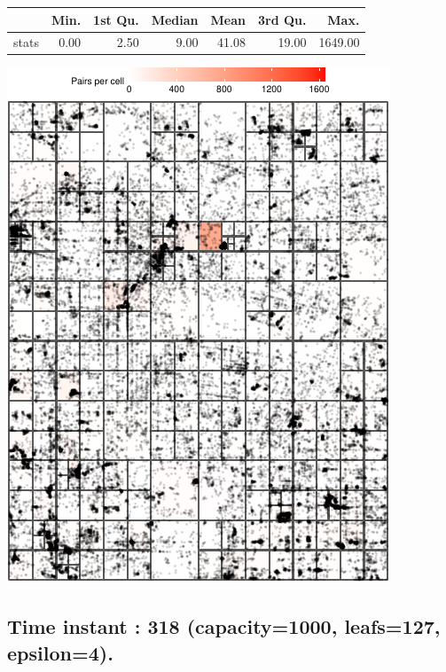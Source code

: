 \documentclass[
  9pt,
  landscape]{article}
\begin{document}
\begin{minipage}{0.5\textwidth} 
\centering 
\begin{tabular}{rrrrrrr}
  \hline
 & Min. & 1st Qu. & Median & Mean & 3rd Qu. & Max. \\ 
  \hline
stats & 0.00 & 2.50 & 9.00 & 41.08 & 19.00 & 1649.00 \\ 
   \hline
\end{tabular}
\vspace{0.5cm} 


\includegraphics[width=1\linewidth,height=0.8\textheight]{distance_files/figure-latex/p2_318_500_4-1} 

\end{minipage}

\pagebreak

\hypertarget{time-instant-318-capacity1000-leafs127-epsilon4.}{%
\subsection{Time instant : 318 (capacity=1000, leafs=127,
epsilon=4).}\label{time-instant-318-capacity1000-leafs127-epsilon4.}}
\end{document}
